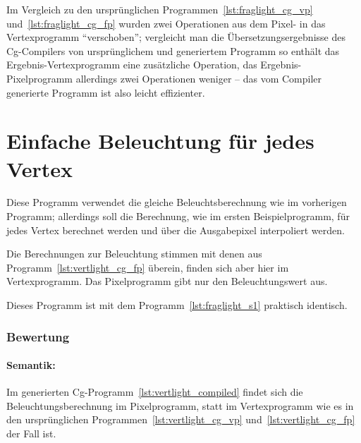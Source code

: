 \documentclass[twoside,a4paper,fleqn,12pt]{book}
\begin{document}
Im Vergleich zu den ursprünglichen Programmen~\ref{lst:fraglight_cg_vp} und~\ref{lst:fraglight_cg_fp}
wurden zwei Operationen aus dem Pixel- in das Vertexprogramm "`verschoben"'; vergleicht man
die Übersetzungsergebnisse des Cg-Compilers von ursprünglichem und generiertem Programm
so enthält das Ergebnis-Vertexprogramm eine zusätzliche Operation,
das Ergebnis-Pixelprogramm allerdings zwei Operationen weniger -- das vom Compiler generierte Programm
ist also leicht effizienter.

\section{Einfache Beleuchtung für jedes Vertex}

Diese Programm verwendet die gleiche Beleuchtsberechnung wie im vorherigen Programm; allerdings soll die Berechnung,
wie im ersten Beispielprogramm, für jedes Vertex berechnet werden und über die Ausgabepixel interpoliert werden.

{}

{}

Die Berechnungen zur Beleuchtung stimmen mit denen aus Programm~\ref{lst:vertlight_cg_fp} überein,
finden sich aber hier im Vertexprogramm. Das Pixelprogramm gibt nur den Beleuchtungswert aus.

{}

Dieses Programm ist mit dem Programm~\ref{lst:fraglight_s1} praktisch identisch.

{}

\subsubsection{Bewertung}
\paragraph{Semantik:}
Im generierten Cg-Programm~\ref{lst:vertlight_compiled} findet sich die Beleuchtungsberechnung im
Pixelprogramm, statt im Vertexprogramm wie es in den ursprünglichen Programmen~\ref{lst:vertlight_cg_vp}
und~\ref{lst:vertlight_cg_fp} der Fall ist.
\end{document}
